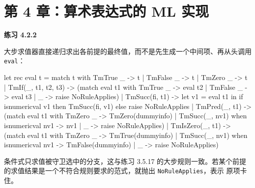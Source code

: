 \section*{第 4 章：算术表达式的 ML 实现}

\begin{taplsolutionentrybox}
\label{sol:translator:4.2.2}
\textbf{练习 4.2.2}

大步求值器直接递归求出各前提的最终值，而不是先生成一个中间项、再从头调用
\texttt{eval}：

\begin{taplocamlcode}
let rec eval t =
  match t with
    TmTrue _ -> t
  | TmFalse _ -> t
  | TmZero _ -> t
  | TmIf(_, t1, t2, t3) ->
      (match eval t1 with
         TmTrue _ -> eval t2
       | TmFalse _ -> eval t3
       | _ -> raise NoRuleApplies)
  | TmSucc(fi, t1) ->
      let v1 = eval t1 in
      if isnumericval v1 then TmSucc(fi, v1)
      else raise NoRuleApplies
  | TmPred(_, t1) ->
      (match eval t1 with
         TmZero _ -> TmZero(dummyinfo)
       | TmSucc(_, nv1) when isnumericval nv1 -> nv1
       | _ -> raise NoRuleApplies)
  | TmIsZero(_, t1) ->
      (match eval t1 with
         TmZero _ -> TmTrue(dummyinfo)
       | TmSucc(_, nv1) when isnumericval nv1 ->
           TmFalse(dummyinfo)
       | _ -> raise NoRuleApplies)
\end{taplocamlcode}

条件式只求值被守卫选中的分支，这与练习 3.5.17 的大步规则一致。若某个前提
的求值结果是一个不符合规则要求的范式，就抛出 \texttt{NoRuleApplies}，表示
原项卡住。

\end{taplsolutionentrybox}
